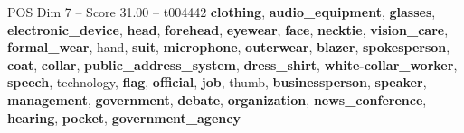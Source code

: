 \begin{textsample}{POS Dim 7 – Score 31.00 – t004442}  \label{ex:f7_pos_001}
\textbf{clothing}, \textbf{audio\_equipment}, \textbf{glasses}, \textbf{electronic\_device}, \textbf{head}, \textbf{forehead}, \textbf{eyewear}, \textbf{face}, \textbf{necktie}, \textbf{vision\_care}, \textbf{formal\_wear}, hand, \textbf{suit}, \textbf{microphone}, \textbf{outerwear}, \textbf{blazer}, \textbf{spokesperson}, \textbf{coat}, \textbf{collar}, \textbf{public\_address\_system}, \textbf{dress\_shirt}, \textbf{white-collar\_worker}, \textbf{speech}, technology, \textbf{flag}, \textbf{official}, \textbf{job}, thumb, \textbf{businessperson}, \textbf{speaker}, \textbf{management}, \textbf{government}, \textbf{debate}, \textbf{organization}, \textbf{news\_conference}, \textbf{hearing}, \textbf{pocket}, \textbf{government\_agency}

\end{textsample}
